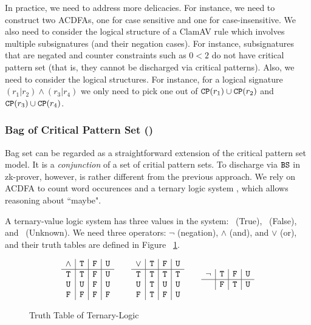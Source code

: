 In practice, we need to address more delicacies. For instance,
we need to construct two ACDFAs, one for case sensitive
and one for case-insensitive. We also need to consider
the logical structure of a ClamAV rule which involves multiple
subsignatures (and their negation cases). For instance,
subsignatures that are negated and counter constraints such as
$0<2$ do not have critical pattern set (that is, they cannot be discharged
via critical patterns). Also, we need to consider the logical structures.
For instance, for a logical signature $(r_1 \vert r_2) \wedge (r_3 \vert r_4)$
we only need to pick one out of $\texttt{CP}(r_1) \cup \texttt{CP}(r_2)$ and
$\texttt{CP}(r_3) \cup \texttt{CP}(r_4)$.


\subsubsection{Bag of Critical Pattern Set (\bw)}
Bag set can be regarded as a straightforward extension of
the critical pattern set model. It is a {\em conjunction} of
a set of critial pattern sets.  To discharge via
$\texttt{BS}$ in zk-prover, however, is rather different 
from the previous approach. We rely on ACDFA to count word occurences
and a ternary logic system \cite{ternarylogic},
which allows reasoning about ``maybe".

A ternary-value logic system has three values in the system:
\true ~(True), \false ~(False), and \unknown ~(Unknown). 
We need three operators: $\neg$ (negation), $\wedge$ (and),
and $\vee$ (or), and their truth tables are defined in Figure
\ \ref{fig:ternary}.

\begin{figure}
\begin{small}
\begin{displaymath}
\begin{array}{c|c|c|c}
	\wedge & \texttt{T} & \texttt{F} & \texttt{U} \\
	\hline
	\texttt{T} & \texttt{T} & \texttt{F} & \texttt{U} \\
	\texttt{U} & \texttt{U} & \texttt{F} & \texttt{U} \\
	\texttt{F} & \texttt{F} & \texttt{F} & \texttt{F} 
\end{array}
\qquad
\begin{array}{c|c|c|c}
	\vee & \texttt{T} & \texttt{F} & \texttt{U} \\
	\hline
	\texttt{T} & \texttt{T} & \texttt{T} & \texttt{T} \\
	\texttt{U} & \texttt{T} & \texttt{U} & \texttt{U} \\
	\texttt{F} & \texttt{T} & \texttt{F} & \texttt{U}
\end{array}
\qquad
\begin{array}{c|c|c|c}
	\neg & \texttt{T} & \texttt{F} & \texttt{U} \\
	\hline
		 & \texttt{F}& \texttt{T} & \texttt{U} \\
\end{array}
\end{displaymath}
\end{small}
\caption{Truth Table of Ternary-Logic}
\label{fig:ternary}
\end{figure}


